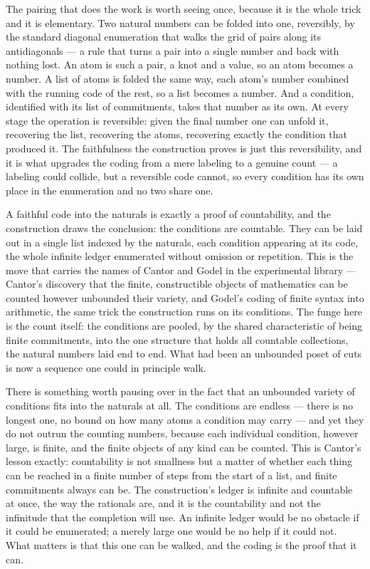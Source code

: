 The pairing that does the work is worth seeing once, because it is the whole trick and it is elementary.
Two natural numbers can be folded into one, reversibly, by the standard diagonal enumeration that walks
the grid of pairs along its antidiagonals --- a rule that turns a pair into a single number and back with
nothing lost. An atom is such a pair, a knot and a value, so an atom becomes a number. A list of atoms is
folded the same way, each atom's number combined with the running code of the rest, so a list becomes a
number. And a condition, identified with its list of commitments, takes that number as its own. At every
stage the operation is reversible: given the final number one can unfold it, recovering the list,
recovering the atoms, recovering exactly the condition that produced it. The faithfulness the
construction proves is just this reversibility, and it is what upgrades the coding from a mere labeling to
a genuine count --- a labeling could collide, but a reversible code cannot, so every condition has its own
place in the enumeration and no two share one.

A faithful code into the naturals is exactly a proof of countability, and the construction draws the
conclusion: the conditions are countable. They can be laid out in a single list indexed by the naturals,
each condition appearing at its code, the whole infinite ledger enumerated without omission or
repetition. This is the move that carries the names of Cantor and Godel in the experimental library ---
Cantor's discovery that the finite, constructible objects of mathematics can be counted however
unbounded their variety, and Godel's coding of finite syntax into arithmetic, the same trick the
construction runs on its conditions. The funge here is the count itself: the conditions are pooled, by the
shared characteristic of being finite commitments, into the one structure that holds all countable
collections, the natural numbers laid end to end. What had been an unbounded poset of cuts is now a
sequence one could in principle walk.

There is something worth pausing over in the fact that an unbounded variety of conditions fits into the
naturals at all. The conditions are endless --- there is no longest one, no bound on how many atoms a
condition may carry --- and yet they do not outrun the counting numbers, because each individual
condition, however large, is finite, and the finite objects of any kind can be counted. This is Cantor's
lesson exactly: countability is not smallness but a matter of whether each thing can be reached in a
finite number of steps from the start of a list, and finite commitments always can be. The construction's
ledger is infinite and countable at once, the way the rationals are, and it is the countability and not
the infinitude that the completion will use. An infinite ledger would be no obstacle if it could be
enumerated; a merely large one would be no help if it could not. What matters is that this one can be
walked, and the coding is the proof that it can.

